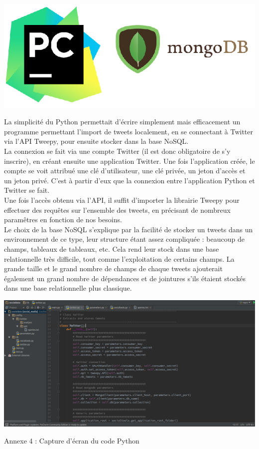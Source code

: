 \documentclass[a4paper,12pt]{article}
\begin{document}
\begin{center}
    \includegraphics[scale=0.5]{illustrations/pycharm-mongodb-logo}
\end{center}

La simplicité du Python permettait d'écrire simplement mais efficacement un programme permettant l'import de tweets localement, en se connectant à Twitter via l'API Tweepy, pour ensuite stocker dans la base NoSQL. \\
La connexion se fait via une compte Twitter (il est donc obligatoire de s'y inscrire), en créant ensuite une application Twitter. Une fois l'application créée, le compte se voit attribué une clé d'utilisateur, une clé privée, un jeton d'accès et un jeton privé. C'est à partir d'eux que la connexion entre l'application Python et Twitter se fait.\\
Une fois l'accès obtenu via l'API, il suffit d'importer la librairie Tweepy pour effectuer des requêtes sur l'ensemble des tweets, en précisant de nombreux paramêtres en fonction de nos besoins. \\

Le choix de la base NoSQL s'explique par la facilité de stocker un tweets dans un environnement de ce type, leur structure étant assez compliquée : beaucoup de champs, tableaux de tableaux, etc. Cela rend leur stock dans une base relationnelle très difficile, tout comme l'exploitation de certains champs. La grande taille et le grand nombre de champs de chaque tweets ajouterait également un grand nombre de dépendances et de jointures s'ils étaient stockés dans une base relationnelle plus classique.

\begin{center}
    \hspace*{-0.22\textwidth}
    \includegraphics[scale=0.6]{illustrations/python-screenshot}
    
    Annexe 4 : Capture d'écran du code Python
\end{center}
\end{document}
